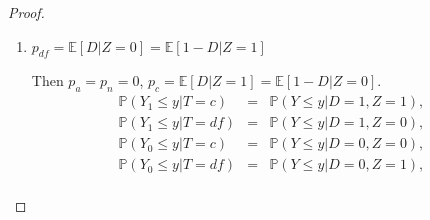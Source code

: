\documentclass[12pt]{article}
\theoremstyle{plain}
\theoremstyle{definition}
\theoremstyle{remark}
\begin{document}
\begin{proof}
\begin{enumerate}
\begin{eqnarray*}
    \Theta_I^{3,2}(A_2) &=& \Bigg \{\Gamma \in \mathbb R^{20}: \theta_{0a}(p_a)=\theta_{1a}(p_a) = \mu_{1a}(p_a) - \mu_{0a}, \theta_{0n}(p_n) = \theta_{1n}(p_n) = \mu_{1n} - \mu_{0n},\\
   && \qquad \theta_{0c}(p_{c})=\theta_{1c}(p_{c})=\frac{\mathbb{E}[Y D  \vert  Z=1]-p_a \mu_{1 a}(p_a)}{\mathbb{E}[D  \vert  Z=1]-p_a}-\mathbb{E}[Y  \vert D=0,  Z=0],\\   
   &&\qquad \theta_{0df}(p_{df})=\theta_{1df}(p_{df}) = \frac{\mathbb{E}[Y D  \vert  Z=0]-p_a \mu_{1 a}(p_a)}{\mathbb{E}[D  \vert  Z=0]-p_a}- \mathbb{E}[Y  \vert D=0, Z=1],\\   
   && \qquad \delta_{0a}=\delta_{1a}=\delta_{0c}=\delta_{1c}=\delta_{0df}=\delta_{1df}=\delta_{0n}=\delta_{1n}=0,\\
   && \qquad p_a=\mathbb{E}[D  \vert  Z=0]-\mathbb{E}[1-D  \vert  Z=1], p_c=\mathbb{E}[1-D  \vert  Z=0],\\
   && \qquad p_{df} = \mathbb{E}[1-D  \vert  Z=1], p_n=0,\\
    && \qquad \mu_{1a}(p_a) \in \left[\mu_{F_{1a}^{UB}}(p_a),\mu_{F_{1a}^{LB}}(p_a)\right], \mu_{1n}, \mu_{0n}, \mu_{0a} \in \left[\inf \mathcal{Y}, \sup \mathcal{Y}\right]
   \Bigg \}, 
\end{eqnarray*}

    \item $p_{df}=\mathbb E[D\vert Z=0] = \mathbb E[1-D\vert Z=1]$

    Then $p_a=p_{n}=0$, $p_c=\mathbb E[D\vert Z=1]=\mathbb E[1-D\vert Z=0]$.
    \begin{eqnarray*}
    \mathbb P(Y_1 \leq y \vert T=c) &=& \mathbb P(Y \leq y \vert D=1, Z=1),\\
    \mathbb P(Y_1 \leq y \vert T=df) &=& \mathbb P(Y \leq y \vert D=1, Z=0),\\
    \mathbb P(Y_0 \leq y \vert T=c) &=& \mathbb P(Y \leq y \vert D=0, Z=0),\\
    \mathbb P(Y_0 \leq y \vert T=df) &=& \mathbb P(Y \leq y \vert D=0, Z=1),\\
    \end{eqnarray*}
    

\end{enumerate}
\end{proof}
\end{document}
